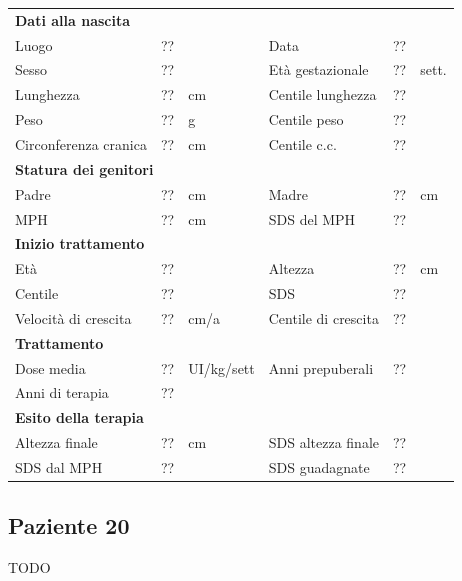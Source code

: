 \begin{table}[!h]
\begin{tabular}{lrllrl}
\toprule
\multicolumn{6}{l}{\textbf{Dati alla nascita}}\\
Luogo 		& \multicolumn{2}{l}{??} 	& Data 					& \multicolumn{2}{l}{??} 	\\
Sesso 		& \multicolumn{2}{l}{??} 	& Età gestazionale 		& ?? 		& sett.\\
Lunghezza 	& ?? 		& cm 				& Centile lunghezza		& ?? 		\\
Peso 		& ?? 		& g					& Centile peso			& ?? 		\\
Circonferenza cranica	& ?? 		& cm 	& Centile c.c.			& ?? \\
\midrule
\multicolumn{6}{l}{\textbf{Statura dei genitori}}\\
Padre 		& ?? & cm 	& Madre 				& ?? & cm \\
MPH 		& ?? & cm 	& SDS del MPH 			& ??\\
\midrule
\multicolumn{6}{l}{\textbf{Inizio trattamento}} \\
Età	& ?? & 		& Altezza 				& ?? & cm  \\
Centile & ?? 	 &		& SDS		& ?? \\
Velocità di crescita & ?? & cm/a	& Centile di crescita & ??\\
\midrule
\multicolumn{6}{l}{\textbf{Trattamento}} \\
Dose media		& ?? & UI/kg/sett & Anni prepuberali & ??\\
Anni di terapia & ??\\
\midrule
\multicolumn{6}{l}{\textbf{Esito della terapia}} \\
Altezza finale			& ?? & cm 	& SDS altezza finale		& ??\\
SDS dal MPH				& ?? &		& SDS guadagnate 			& ??\\
\bottomrule
\end{tabular}
\end{table}
\clearpage


\subsection*{Paziente 20}

TODO

